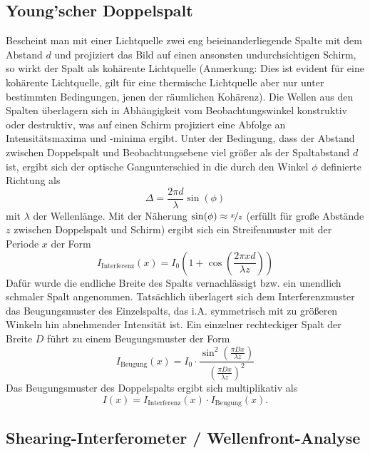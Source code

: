 \documentclass[ngerman]{scrartcl}
\begin{document}
\subsection{Young'scher Doppelspalt}
\label{sec:grundlagen_youngscher_doppelspalt}

Bescheint man mit einer Lichtquelle zwei eng beieinanderliegende Spalte mit dem Abstand $d$ und projiziert das Bild auf einen ansonsten undurchsichtigen Schirm, so wirkt der Spalt als kohärente Lichtquelle (Anmerkung: Dies ist evident für eine kohärente Lichtquelle, gilt für eine thermische Lichtquelle aber nur unter bestimmten Bedingungen, jenen der räumlichen Kohärenz). Die Wellen aus den Spalten überlagern sich in Abhängigkeit vom Beobachtungswinkel konstruktiv oder destruktiv, was auf einen Schirm projiziert eine Abfolge an Intensitätsmaxima und -minima ergibt. Unter der Bedingung, dass der Abstand zwischen Doppelspalt und Beobachtungsebene viel größer als der Spaltabstand $d$ ist, ergibt sich der optische Gangunterschied in die durch den Winkel $\phi$ definierte Richtung als
\begin{equation}
    \Delta = \frac{2 \pi d}{\lambda} \sin(\phi)
\end{equation}
mit $\lambda$ der Wellenlänge.
Mit der Näherung $\sin(\phi) \approx \nicefrac{x}{z}$ (erfüllt für große Abstände $z$ zwischen Doppelspalt und Schirm) ergibt sich ein Streifenmuster mit der Periode $x$ der Form
\begin{equation}
    I_{\text{Interferenz}}(x) = I_0 \left(1 + \cos(\frac{2 \pi x d}{\lambda z}) \right)
\end{equation}
Dafür wurde die endliche Breite des Spalts vernachlässigt bzw. ein unendlich schmaler Spalt angenommen. Tatsächlich überlagert sich dem Interferenzmuster das Beugungsmuster des Einzelspalts, das i.A. symmetrisch mit zu größeren Winkeln hin abnehmender Intensität ist. Ein einzelner rechteckiger Spalt der Breite $D$ führt zu einem Beugungsmuster der Form
\begin{equation}
    I_{\text{Beugung}}(x) = I_0 \cdot \frac{\sin^2(\frac{\pi D x}{\lambda z})}{\left(\frac{\pi D x}{\lambda z}\right)^2}
\end{equation}
Das Beugungsmuster des Doppelspalts ergibt sich multiplikativ als
\[I(x) = I_{\text{Interferenz}}(x) \cdot I_{\text{Beugung}}(x).\]%
%
%
\subsection{Shearing-Interferometer / Wellenfront-Analyse}
\label{sec:grundlagen_shearing_interferometer}
\end{document}
